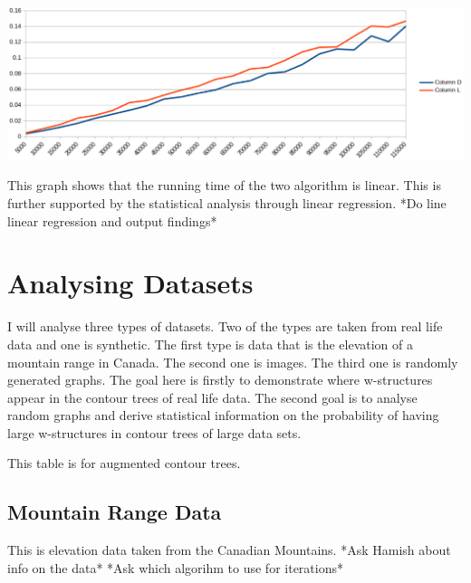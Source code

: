 \includegraphics[left]{./images/running-time.eps}

This graph shows that the running time of the two algorithm is linear. This is further supported by the statistical analysis through linear regression. *Do line linear regression and output findings*

\section{Analysing Datasets}

I will analyse three types of datasets. Two of the types are taken from real life data and one is synthetic. The first type is data that is the elevation of a mountain range in Canada. The second one is images. The third one is randomly generated graphs. The goal here is firstly to demonstrate where w-structures appear in the contour trees of real life data. The second goal is to analyse random graphs and derive statistical information on the probability of having large w-structures in contour trees of large data sets.


This table is for augmented contour trees.

\subsection{Mountain Range Data}

This is elevation data taken from the Canadian Mountains. *Ask Hamish about info on the data* *Ask which algorihm to use for iterations*





